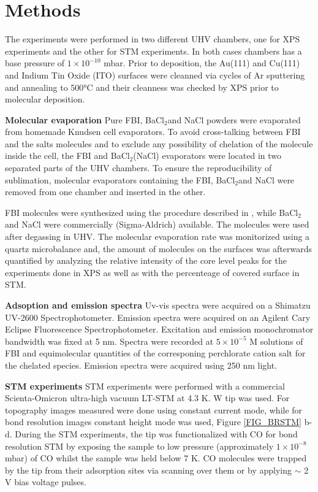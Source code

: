 \documentclass[aps,prl,reprint,longbibliography,superscriptaddress, english]{revtex4-1}
\def\BappCl{BaCl$_2$}
\begin{document}
\section{Methods}
The experiments were performed in two different UHV chambers, one for XPS experiments and the other for STM experiments. In both cases chambers has a base pressure of $1\times10^{-10}$ mbar. Prior to deposition, the Au(111) and Cu(111) and Indium Tin Oxide (ITO) surfaces were cleanned via cycles of Ar sputtering and annealing to 500°C and their cleanness was checked by XPS prior to molecular deposition. 

\textbf{Molecular evaporation}
Pure FBI, \BappCl and NaCl powders were evaporated from homemade Knudsen cell evaporators. To avoid cross-talking between FBI and the salts molecules and to exclude any possibility of chelation of the molecule inside the cell, the FBI and \BappCl (NaCl) evaporators were located in two separated parts of the UHV chambers. To ensure the reproducibility of sublimation, molecular evaporators containing the FBI, \BappCl and NaCl were removed from one chamber and inserted in the other.  

FBI molecules were synthesized using the procedure described in \cite{rivilla_fluorescent_2020}, while \BappCl and NaCl were commercially (Sigma-Aldrich) available. The molecules were used after degassing in UHV.
The molecular evaporation rate was monitorized using a quartz microbalance and, the amount of molecules on the surfaces was afterwards quantified by analyzing the relative intensity of the core level peaks for the experiments done in XPS as well as with the percenteage of covered surface in STM. 

\textbf{Adsoption and emission spectra}
 Uv-vis spectra were acquired on a Shimatzu UV-2600 Spectrophotometer. Emission spectra were acquired on an Agilent Cary Eclipse Fluorescence Spectrophotometer. Excitation and emission monochromator bandwidth was fixed at 5 nm. Spectra were recorded at $5\times10^{-5}$ M solutions of FBI and equimolecular quantities of the corresponing perchlorate cation salt for the chelated species. Emission spectra were acquired using 250 nm light.

\textbf{STM experiments}
STM experiments were performed with a commercial Scienta-Omicron ultra-high vacuum LT-STM at 4.3 K. W tip  was used. For topography images measured were done using constant current mode, while for bond resolution images constant height mode was used, Figure \ref{FIG_BRSTM} b-d. During the STM experiments, the tip was functionalized with CO for bond resolution STM by exposing the sample to low pressure (approximately $1 \times 10^{-8}$ mbar) of CO whilst the sample was held below 7 K. CO molecules were trapped by the tip from their adsorption sites via scanning over them or by applying $\sim$ 2 V bias voltage pulses. 
\end{document}
